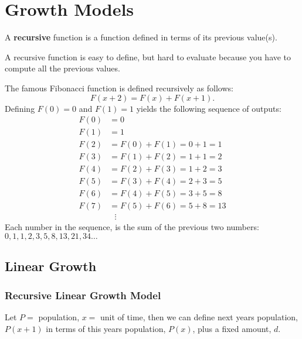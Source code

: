 \chapter{Growth Models}%
\label{chap:growth-models}

\begin{definition}
  A \textbf{recursive} function is a function defined in terms of its
  previous value(s).
\end{definition}

\begin{note}
  A recursive function is easy to define, but hard to evaluate because
  you have to compute all the previous values.
\end{note}

\begin{example}
  The famous Fibonacci function is defined recursively as follows:
  \[
    F(x+2) = F(x)+F(x+1).
  \]
  Defining \(F(0)=0\) and \(F(1)=1\) yields the following sequence of
  outputs:
  \begin{align*}
    F(0) &= 0 \\
    F(1) &= 1 \\
    F(2) &= F(0) + F(1) = 0+1 = 1 \\
    F(3) &= F(1) + F(2) = 1+1 = 2 \\
    F(4) &= F(2) + F(3) = 1+2 = 3 \\
    F(5) &= F(3) + F(4) = 2+3 = 5 \\
    F(6) &= F(4) + F(5) = 3+5 = 8 \\
    F(7) &= F(5) + F(6) = 5+8 = 13 \\
     & \: \: \: \vdots
  \end{align*}
  Each number in the sequence, is the sum of the previous two numbers:
  \(0, 1, 1, 2, 3, 5, 8, 13, 21, 34\ldots\)
\end{example}

\section{Linear Growth}%
\label{sec:linear-growth}

\subsection{Recursive Linear Growth Model}%
\label{sec:recursive-linear}

Let \(P=\) population, \(x=\) unit of time, then we can define next
years population, \(P(x+1)\) in terms of this years population,
\(P(x)\), plus a fixed amount, \(d\).

